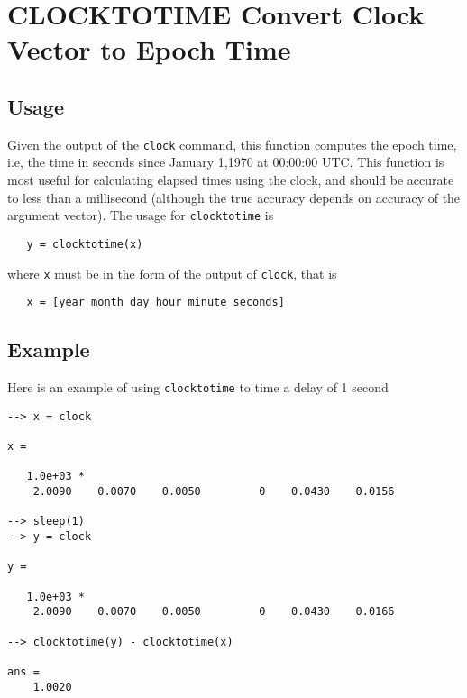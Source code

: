 \section{CLOCKTOTIME Convert Clock Vector to Epoch Time}

\subsection{Usage}

Given the output of the \verb|clock| command, this function computes
the epoch time, i.e, the time in seconds since January 1,1970 
at 00:00:00 UTC.  This function is most useful for calculating elapsed
times using the clock, and should be accurate to less than a millisecond
(although the true accuracy depends on accuracy of the argument vector). 
The usage for \verb|clocktotime| is
\begin{verbatim}
   y = clocktotime(x)
\end{verbatim}
where \verb|x| must be in the form of the output of \verb|clock|, that is
\begin{verbatim}
   x = [year month day hour minute seconds]
\end{verbatim}
\subsection{Example}

Here is an example of using \verb|clocktotime| to time a delay of 1 second
\begin{verbatim}
--> x = clock

x = 

   1.0e+03 * 
    2.0090    0.0070    0.0050         0    0.0430    0.0156 

--> sleep(1)
--> y = clock

y = 

   1.0e+03 * 
    2.0090    0.0070    0.0050         0    0.0430    0.0166 

--> clocktotime(y) - clocktotime(x)

ans = 
    1.0020 
\end{verbatim}
